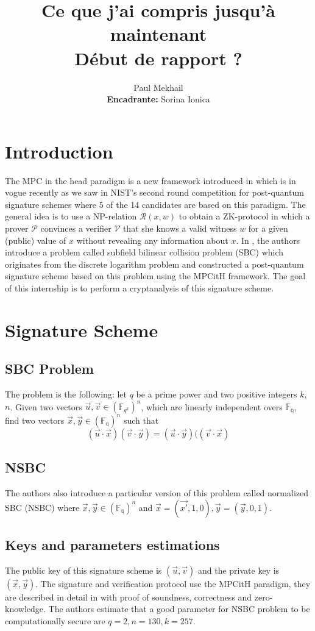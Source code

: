 \documentclass[english]{article}
\author{Paul Mekhail\\ \textbf{Encadrante:} Sorina Ionica}
\title{Ce que j'ai compris jusqu'à maintenant\\Début de rapport ?}
\begin{document}
	\maketitle
	
	\section{Introduction}
		The MPC in the head paradigm is a new framework introduced in \cite{IKOS07} which is in vogue recently as we saw in NIST's second round competition for post-quantum signature schemes where 5 of the 14 candidates are based on this paradigm.
		The general idea is to use a NP-relation $\mathcal{R}(x, w)$ to obtain a ZK-protocol in which a prover $\mathcal{P}$ convinces a verifier $\mathcal{V}$ that she knows a valid witness $w$ for a given (public) value of $x$ without revealing any information about $x$.
		In \cite{HJ23}, the authors introduce a problem called subfield bilinear collision problem (SBC) which originates from the discrete logarithm problem and constructed a post-quantum signature scheme based on this problem using the MPCitH framework.
		The goal of this internship is to perform a cryptanalysis of this signature scheme.
		
		\section{Signature Scheme}
		\subsection{SBC Problem}
		The problem is the following: let $q$ be a prime power and two positive integers $k$, $n$.
		\newline
		Given two vectors $\vec{u}, \vec{v} \in (\mathbb{F}_{q^k})^n$, which are linearly independent overs $\mathbb{F_q}$, find two vectors $\vec{x}, \vec{y} \in (\mathbb{F_q})^n$ such that $$(\vec{u} \cdot \vec{x})(\vec{v} \cdot \vec{y}) = (\vec{u} \cdot \vec{y})((\vec{v} \cdot \vec{x})$$
		
		\subsection{NSBC}
		The authors also introduce a particular version of this problem called normalized SBC (NSBC) where $\vec{x}, \vec{y} \in (\mathbb{F_q})^n$ and
		$\vec{x} = (\vec{x'}, 1, 0), \vec{y} = (\vec{y}, 0, 1)$.
 		
 		\subsection{Keys and parameters estimations}
		The public key of this signature scheme is $(\vec{u},\vec{v})$ and the private key is $(\vec{x}, \vec{y})$.
		The signature and verification protocol use the MPCitH paradigm, they are described in detail in \cite{HJ23} with proof of soundness, correctness and zero-knowledge.
		The authors estimate that a good parameter for NSBC problem to be computationally secure are $q = 2, n = 130, k = 257$.
		
\end{document}

